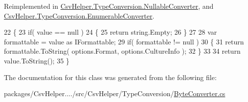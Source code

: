 Reimplemented in \hyperlink{a00116_a7205cdb61d2d119582958232b3e63109}{Csv\-Helper.\-Type\-Conversion.\-Nullable\-Converter}, and \hyperlink{a00078_a7e07e9532857d748654d37db590a0e11}{Csv\-Helper.\-Type\-Conversion.\-Enumerable\-Converter}.


\begin{DoxyCode}
22         \{
23             \textcolor{keywordflow}{if}( value == null )
24             \{
25                 \textcolor{keywordflow}{return} string.Empty;
26             \}
27 
28             var formattable = value as IFormattable;
29             \textcolor{keywordflow}{if}( formattable != null )
30             \{
31                 \textcolor{keywordflow}{return} formattable.ToString( options.Format, options.CultureInfo );
32             \}
33 
34             \textcolor{keywordflow}{return} value.ToString();
35         \}
\end{DoxyCode}


The documentation for this class was generated from the following file\-:\begin{DoxyCompactItemize}
\item 
packages/\-Csv\-Helper..../src/\-Csv\-Helper/\-Type\-Conversion/\hyperlink{a00225}{Byte\-Converter.\-cs}\end{DoxyCompactItemize}
